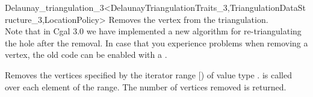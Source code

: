 \begin{ccRefClass}{Delaunay_triangulation_3<DelaunayTriangulationTraits_3,TriangulationDataStructure_3,LocationPolicy>}
{Removes the vertex  from the triangulation.\\
Note that in {\sc Cgal} 3.0 we have implemented a new algorithm for
re-triangulating the hole after the removal.
In case that you experience problems when removing a vertex, the old
code can be enabled with a .
}

{Removes the vertices specified by the iterator range [)
of value type .
 is called over each element of the range.
The number of vertices removed is returned.
}



\end{ccRefClass}
